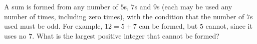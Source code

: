 A sum is formed from any number of $5$s, $7$s and $9$s (each may be used any number of times, including zero times), with the condition that the number of $7$s used must be odd. For example, $12=5+7$ can be formed, but $5$ cannot, since it uses no $7$. What is the largest positive integer that cannot be formed?
